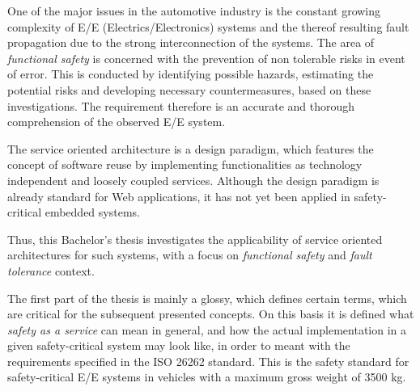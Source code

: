 One of the major issues in the automotive industry is the constant growing complexity of E/E (Electrics/Electronics) systems and the thereof resulting fault propagation due to the strong interconnection of the systems. The area of \emph{functional safety} is concerned with the prevention of non tolerable risks in event of error. This is conducted by identifying possible hazards, estimating the potential risks and developing necessary countermeasures, based on these investigations. The requirement therefore is an accurate and thorough comprehension of the observed E/E system.

The service oriented architecture is a design paradigm, which features the concept of software reuse by implementing functionalities as technology independent and loosely coupled services. Although the design paradigm is already standard for Web applications, it has not yet been applied in safety-critical embedded systems.

Thus, this Bachelor's thesis investigates the applicability of service oriented architectures for such systems, with a focus on \emph{functional safety} and \emph{fault tolerance} context. 

The first part of the thesis is mainly a glossy, which defines certain terms, which are critical for the subsequent presented concepts. On this basis it is defined what \emph{safety as a service} can mean in general, and how the actual implementation in a given safety-critical system may look like, in order to meant with the requirements specified in the ISO 26262 standard. This is the safety standard for safety-critical E/E systems in vehicles with a maximum gross weight of 3500 kg.